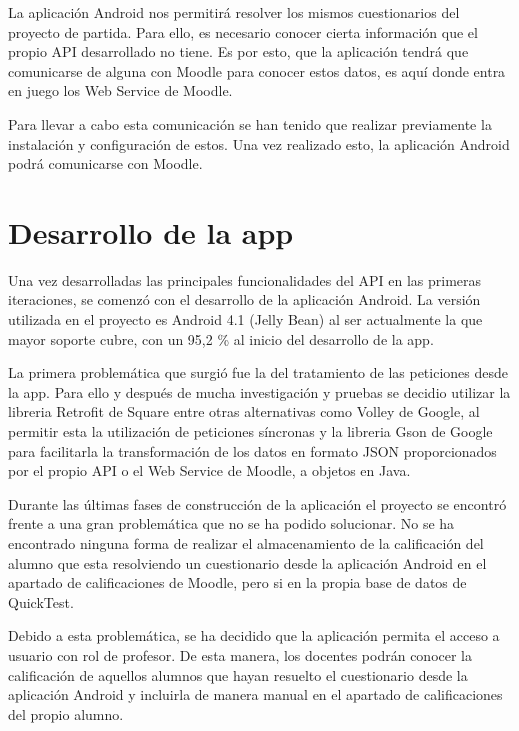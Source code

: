La aplicación Android nos permitirá resolver los mismos cuestionarios del proyecto de partida. Para ello, es necesario conocer cierta información que el propio API desarrollado no tiene. Es por esto, que la aplicación tendrá que comunicarse de alguna con Moodle para conocer estos datos, es aquí donde entra en juego los Web Service de Moodle. 

Para llevar a cabo esta comunicación se han tenido que realizar previamente la instalación y configuración de estos. Una vez realizado esto, la aplicación Android podrá comunicarse con Moodle.


\section{Desarrollo de la app}

Una vez desarrolladas las principales funcionalidades del API en las primeras iteraciones, se comenzó con el desarrollo de la aplicación Android.
La versión utilizada en el proyecto es Android 4.1 (Jelly Bean) al ser actualmente la que mayor soporte cubre, con un 95,2 \% al inicio del desarrollo de la app.

La primera problemática que surgió fue la del tratamiento de las peticiones desde la app. Para ello y después de mucha investigación y pruebas se decidio utilizar la libreria Retrofit de Square \cite{wiki:retrofit} entre otras alternativas como Volley \cite{wiki:volley} de Google, al permitir esta la utilización de peticiones síncronas y la libreria Gson de Google \cite{wiki:gson} para facilitarla la transformación de los datos en formato JSON proporcionados por el propio API o el Web Service de Moodle, a objetos en Java.

Durante las últimas fases de construcción de la aplicación el proyecto se encontró frente a una gran problemática que no se ha podido solucionar. No se ha encontrado ninguna forma de realizar el almacenamiento de la calificación del alumno que esta resolviendo un cuestionario desde la aplicación Android en el apartado de calificaciones de Moodle, pero si en la propia base de datos de QuickTest.

Debido a esta problemática, se ha decidido que la aplicación permita el acceso a usuario con rol de profesor. De esta manera, los docentes podrán conocer la calificación de aquellos alumnos que hayan resuelto el cuestionario desde la aplicación Android y incluirla de manera manual en el apartado de calificaciones del propio alumno.

